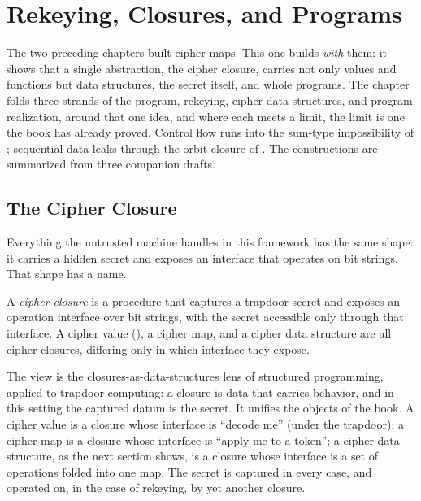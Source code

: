 
\chapter{Rekeying, Closures, and Programs}
\label{ch:rekeying-closures}

The two preceding chapters built cipher maps. This one builds \emph{with}
them: it shows that a single abstraction, the cipher closure, carries not
only values and functions but data structures, the secret itself, and whole
programs. The chapter folds three strands of the program, rekeying, cipher
data structures, and program realization, around that one idea, and where
each meets a limit, the limit is one the book has already proved. Control
flow runs into the sum-type impossibility of ;
sequential data leaks through the orbit closure of .
The constructions are summarized from three companion drafts.

\section{The Cipher Closure}
\label{sec:cipher-closure}

Everything the untrusted machine handles in this framework has the same
shape: it carries a hidden secret and exposes an interface that operates on
bit strings. That shape has a name.

\begin{definition}
\label{def:cipher-closure}
A \emph{cipher closure} is a procedure that captures a trapdoor secret and
exposes an operation interface over bit strings, with the secret accessible
only through that interface. A cipher value (), a
cipher map, and a cipher data structure are all cipher closures, differing
only in which interface they expose.
\end{definition}

The view is the closures-as-data-structures lens of structured programming,
applied to trapdoor computing: a closure is data that carries behavior, and
in this setting the captured datum is the secret. It unifies the objects of
the book. A cipher value is a closure whose interface is ``decode me'' (under
the trapdoor); a cipher map is a closure whose interface is ``apply me to a
token''; a cipher data structure, as the next section shows, is a closure
whose interface is a set of operations folded into one map. The secret is
captured in every case, and operated on, in the case of rekeying, by yet
another closure.


